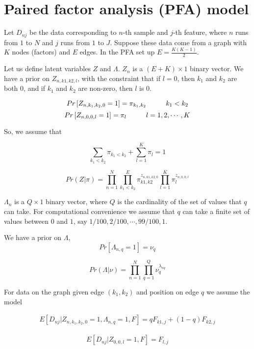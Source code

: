 \documentclass[12pt]{article}
\begin{document}
\section{Paired factor analysis (PFA) model}

Let $D_{nj}$ be the data corresponding to $n$-th sample and $j$-th feature, 
where $n$ runs from $1$ to $N$ and $j$ runs from $1$ to $J$.  
Suppose these data come from a graph with $K$ nodes (factors) and $E$ edges. In the
PFA set up $E=\frac{K(K-1)}{2}$.

Let us define latent variables $Z$ and $\Lambda$. $Z_{n}$ is a $(E+K)
\times 1$ binary vector. We have a prior on $Z_{n,k1,k2,l}$, with the constraint that if $l=0$, then $k_1$ and $k_2$ are both $0$, and if $k_1$ and $k_2$ are non-zero, then $l$ is 0.

$$ Pr \left [ Z_{n, k_1, k_2, 0} = 1 \right ] = \pi_{k_1,k_2} \hspace{1 cm} k_1 < k_2$$
$$ Pr \left [ Z_{n, 0, 0, l} = 1 \right ] = \pi_{l} \hspace{1 cm} l=1,2, \cdots, K$$

So, we assume that 

$$ \sum_{k_1 < k_2} \pi_{k_1 < k_2} + \sum_{l=1}^{K} \pi_{l} = 1 $$

$$  Pr (Z |  \pi )  = \prod_{n=1}^{N} \prod_{k_1 < k_2}^E \pi_{k1,k2}^{z_{n,k1,k2,0}} \prod_{l=1}^{K} \pi_{l}^{z_{n,0,0,l}} $$

$\Lambda_{n}$ is a $Q \times 1$ binary vector, where $Q$ is the cardinality of the set of values that $q$ can take.
For computational convenience we assume that $q$ can take a finite set of values between $0$ and $1$, 
say $1/100, 2/100, \cdots, 99/100, 1$.

We have a prior on  $\Lambda$,
$$ Pr \left [ \Lambda_{n, q} = 1 \right ] = \nu_{q}  $$

$$  Pr (\Lambda | \nu ) = \prod_{n=1}^{N} \prod_{q=1}^{Q} \nu_{q}^{\lambda_{nq}} $$

For data on the graph given edge $(k_1, k_2)$ and position on edge $q$ we assume the model 

\begin{eqnarray}
 E \left [ D_{nj} | Z_{n, k_1, k_2, 0} = 1, \Lambda_{n,q}=1, F \right] = q F_{k1,j} + (1-q) F_{k2,j}
\end{eqnarray}

\begin{eqnarray}
 E \left [ D_{nj} | Z_{0, 0, l} = 1, F \right] =  F_{l,j} 
\end{eqnarray}
\end{document}
